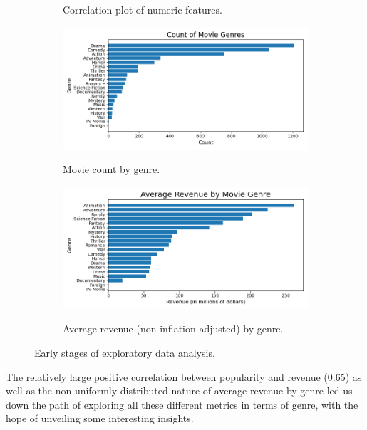 \documentclass[12pt]{article}
\begin{document}
\begin{figure}[h!]
\begin{subfigure}[b]{0.54\textwidth}
\label{fig:sub2}
\caption{Correlation plot of numeric features.}
\end{subfigure}
\begin{subfigure}[b]{0.5\textwidth}
\centering
\includegraphics[width=1\textwidth]{images/eda/count_movie_genres.png}
\label{fig:sub1}
\caption{Movie count by genre.}
\end{subfigure}
\hfill
\begin{subfigure}[b]{0.45\textwidth}
\centering
\includegraphics[width=1\textwidth]{images/eda/mean_revenue_by_genre.png}
\label{fig:sub2}
\caption{Average revenue (non-inflation-adjusted) by genre.}
\end{subfigure}
\caption{Early stages of exploratory data analysis.}
\label{fig:test}
\end{figure}

The relatively large positive correlation between popularity and revenue (0.65) as well as the non-uniformly distributed nature of average revenue by genre led us down the path of exploring all these different metrics in terms of genre, with the hope of unveiling some interesting insights.

\end{document}

